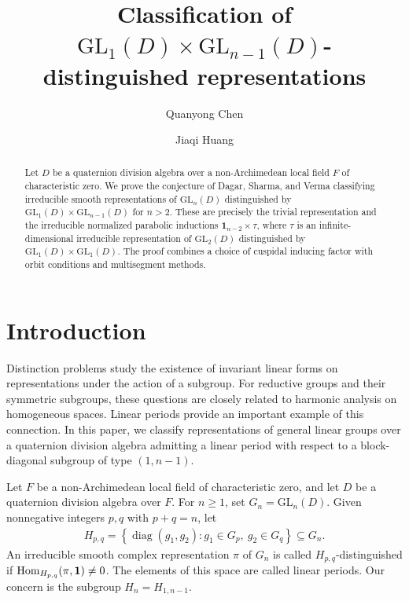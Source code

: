 \documentclass[11pt,leqno]{amsart}
\title[Classification of
$\mathrm{GL}_1(D)\times\mathrm{GL}_{n-1}(D)$-distinguished
representations]
{Classification of
	$\mathrm{GL}_1(D)\times\mathrm{GL}_{n-1}(D)$-distinguished
	representations}
\author[Quanyong Chen]{Quanyong Chen}
\author[Jiaqi Huang]{Jiaqi Huang}
\numberwithin{equation}{section}
\theoremstyle{plain}
\theoremstyle{definition}
\theoremstyle{remark}
\newcommand{\one}{\mathbf{1}}
\begin{document}
	
	\begin{abstract}
		Let $D$ be a quaternion division algebra over a non-Archimedean
		local field $F$ of characteristic zero. 
		We prove the conjecture of Dagar, Sharma, and Verma classifying irreducible smooth
		representations of $\mathrm{GL}_n(D)$ distinguished by
		$\mathrm{GL}_1(D)\times\mathrm{GL}_{n-1}(D)$ for $n>2$.
		These are precisely the trivial representation and the
		irreducible normalized parabolic inductions
		$\one_{n-2}\times\tau$, where $\tau$ is an infinite-dimensional
		irreducible representation of $\mathrm{GL}_2(D)$ distinguished
		by $\mathrm{GL}_1(D)\times\mathrm{GL}_1(D)$.
		The proof combines a choice of cuspidal inducing factor
		with orbit conditions and multisegment methods.
	\end{abstract}
	
	\maketitle
	
	\section{Introduction}
	
	Distinction problems study the existence of invariant linear
	forms on representations under the action of a subgroup.
	For reductive groups and their symmetric subgroups, these
	questions are closely related to harmonic analysis on
	homogeneous spaces. Linear periods provide an important
	example of this connection. In this paper, we classify
	representations of general linear groups over a quaternion
	division algebra admitting a linear period with respect
	to a block-diagonal subgroup of type $(1,n-1)$.
	
	Let $F$ be a non-Archimedean local field of characteristic zero,
	and let $D$ be a quaternion division algebra over $F$.
	For $n\geq 1$, set $G_n=\mathrm{GL}_n(D)$.
	Given nonnegative integers $p,q$ with $p+q=n$, let
	\begin{align*}
		H_{p,q}
		=
		\left\{
		\operatorname{diag}(g_1,g_2):
		g_1\in G_p,\ g_2\in G_q
		\right\}
		\subseteq G_n.
	\end{align*}
	An irreducible smooth complex representation $\pi$ of $G_n$
	is called $H_{p,q}$-distinguished if ${\rm Hom}_{H_{p,q}}(\pi,\one)\neq 0$.
	The elements of this space are called linear periods.
	Our concern is the subgroup $H_n=H_{1,n-1}$.
	
\end{document}
